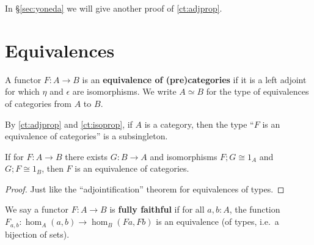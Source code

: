 In \S\ref{sec:yoneda} we will give another proof of \autoref{ct:adjprop}.


\section{Equivalences}
\label{sec:equivalences}

\begin{defn}
  A functor $F:A\to B$ is an \textbf{equivalence of (pre)categories} if it is a left adjoint for which $\eta$ and $\epsilon$ are isomorphisms.  We write $A\simeq B$ for the type of equivalences of categories from $A$ to $B$.
\end{defn}

By \autoref{ct:adjprop} and \autoref{ct:isoprop}, if $A$ is a category, then the type ``$F$ is an equivalence of categories'' is a subsingleton.

\begin{lem}\label{ct:adjointification}
  If for $F:A\to B$ there exists $G:B\to A$ and isomorphisms $F;G\cong 1_A$ and $G;F\cong 1_B$, then $F$ is an equivalence of categories.
\end{lem}
\begin{proof}
  Just like the ``adjointification'' theorem for equivalences of types.
\end{proof}

We say a functor $F:A\to B$ is \textbf{fully faithful} if for all $a,b:A$, the function $F_{a,b}:\hom_A(a,b) \to \hom_B(Fa,Fb)$ is an equivalence (of types, i.e.\ a bijection of sets).

